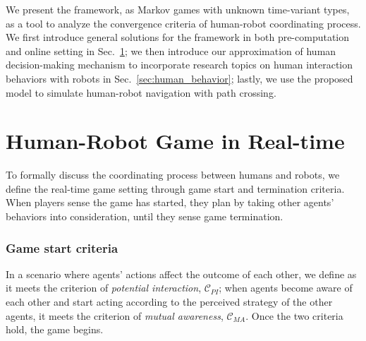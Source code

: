 \documentclass[letterpaper, 10 pt, conference]{ieeeconf}  %
\begin{document}
We present the framework, as Markov games with unknown time-variant types,  
as a tool to analyze the convergence criteria of human-robot coordinating 
process. We first 
introduce general solutions for the framework in both pre-computation and 
online setting in Sec.~\ref{sec:realtime_game}; we then introduce our approximation of human 
decision-making mechanism to incorporate research topics on 
human interaction behaviors with robots in Sec.~\ref{sec:human_behavior}; 
lastly, we use the proposed model to simulate human-robot navigation with path 
crossing.


\vspace{-.3em}
\section{Human-Robot Game in Real-time}\label{sec:realtime_game}
\vspace{-.2em}
To formally discuss the coordinating process between humans and robots, we 
define the real-time game setting through game start and termination criteria. 
When players sense the game has started, they plan by taking other agents' 
behaviors into consideration, until they sense game termination. 
\subsubsection{Game start criteria}
In a scenario where agents' actions affect the outcome of each other, we 
define as it meets the criterion of \textit{potential interaction}, 
$\mathcal{C}_{PI}$; when agents become aware of each other and start acting 
according to the perceived strategy of the other agents, it meets the criterion 
of \textit{mutual awareness}, $\mathcal{C}_{MA}$. Once the two criteria hold, 
the game begins. 
\end{document}
